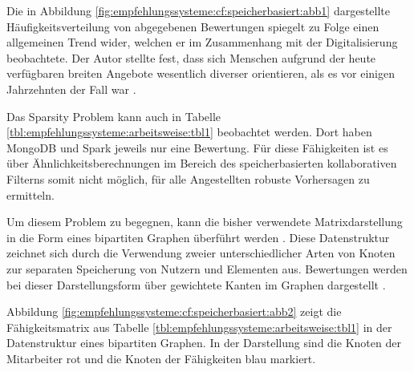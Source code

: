 Die in Abbildung \ref{fig:empfehlungssysteme:cf:speicherbasiert:abb1} dargestellte Häufigkeitsverteilung von abgegebenen Bewertungen spiegelt \textcite[S. 1ff.]{anderson:2007} zu Folge einen allgemeinen Trend wider, welchen er im Zusammenhang mit der Digitalisierung beobachtete. Der Autor stellte fest, dass sich Menschen aufgrund der heute verfügbaren breiten Angebote wesentlich diverser orientieren, als es vor einigen Jahrzehnten der Fall war \cite[S. 1ff.]{anderson:2007}.

Das Sparsity Problem kann auch in Tabelle \ref{tbl:empfehlungssysteme:arbeitsweise:tbl1} beobachtet werden. Dort haben MongoDB und Spark jeweils nur eine Bewertung. Für diese Fähigkeiten ist es über Ähnlichkeitsberechnungen im Bereich des speicherbasierten kollaborativen Filterns somit nicht möglich, für alle Angestellten robuste Vorhersagen zu ermitteln.

Um diesem Problem zu begegnen, kann die bisher verwendete Matrixdarstellung in die Form eines bipartiten Graphen überführt werden \cite[S. 2f.]{huang:2004}. Diese Datenstruktur zeichnet sich durch die Verwendung zweier unterschiedlicher Arten von Knoten zur separaten Speicherung von Nutzern und Elementen aus. Bewertungen werden bei dieser Darstellungsform über gewichtete Kanten im Graphen dargestellt \cite[S. 1f.]{cao:2021}.

Abbildung \ref{fig:empfehlungssysteme:cf:speicherbasiert:abb2} zeigt die Fähigkeitsmatrix aus Tabelle \ref{tbl:empfehlungssysteme:arbeitsweise:tbl1} in der Datenstruktur eines bipartiten Graphen. In der Darstellung sind die Knoten der Mitarbeiter rot und die Knoten der Fähigkeiten blau markiert.

